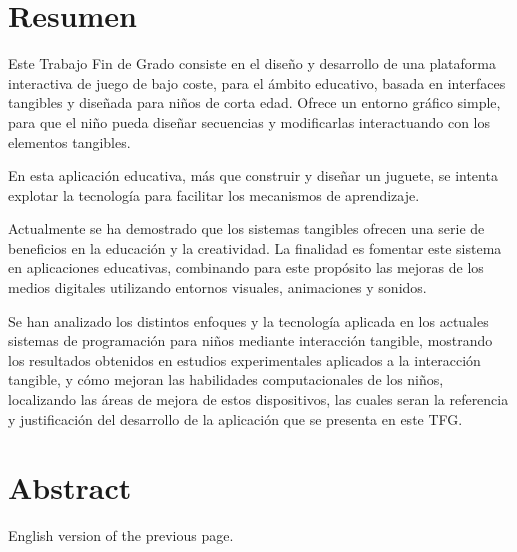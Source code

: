 \chapter{Resumen}
Este Trabajo Fin de Grado consiste en el diseño y desarrollo de una plataforma
interactiva de juego de bajo coste, para el ámbito educativo, basada en
interfaces tangibles y diseñada para niños de corta edad. Ofrece un entorno
gráfico simple, para que el niño pueda diseñar secuencias y modificarlas
interactuando con los elementos tangibles.

En esta aplicación educativa, más que construir y diseñar un juguete, se intenta
explotar la tecnología para facilitar los mecanismos de aprendizaje.

Actualmente se ha demostrado que los sistemas tangibles ofrecen una serie de
beneficios en la educación y la creatividad. La finalidad es fomentar este
sistema en aplicaciones educativas, combinando para este propósito las mejoras
de los medios digitales utilizando entornos visuales, animaciones y sonidos.

Se han analizado los distintos enfoques y la tecnología aplicada en los actuales
sistemas de programación para niños mediante interacción tangible, mostrando los
resultados obtenidos en estudios experimentales aplicados a la interacción
tangible, y cómo mejoran las habilidades computacionales de los niños,
localizando las áreas de mejora de estos dispositivos, las cuales seran la
referencia y justificación del desarrollo de la aplicación que se presenta en
este TFG.




\chapter{Abstract}

English version of the previous page.
